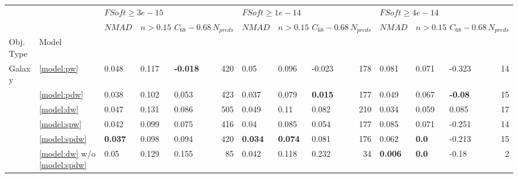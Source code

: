 \documentclass[fleqn,usenatbib]{mnras}
\begin{document}
\begin{table}
	\begin{tabular}{lllllrlllrlllr}
            \hline
                &    & \multicolumn{4}{l}{$FSoft \geq 3e-15$} & \multicolumn{4}{l}{$FSoft \geq 1e-14$} & \multicolumn{4}{l}{$FSoft \geq 4e-14$} \\
                &    &             $NMAD$ &        $n>0.15$ &  $C_{68} - 0.68$ & $N_{preds}$ &             $NMAD$ &        $n>0.15$ &  $C_{68} - 0.68$ & $N_{preds}$ &             $NMAD$ &        $n>0.15$ &  $C_{68} - 0.68$ & $N_{preds}$ \\
            Obj. Type & Model &                    &                 &                  &             &                    &                 &                  &             &                    &                 &                  &             \\
            \hline
            Galaxy & \ref{model:pw} &              0.048 &           0.117 &  \textbf{-0.018} &         420 &               0.05 &           0.096 &           -0.023 &         178 &              0.081 &           0.071 &           -0.323 &          14 \\
                & \ref{model:pdw} &              0.038 &           0.102 &            0.053 &         423 &              0.037 &           0.079 &   \textbf{0.015} &         177 &              0.049 &           0.067 &   \textbf{-0.08} &          15 \\
                & \ref{model:dw} &              0.047 &           0.131 &            0.086 &         505 &              0.049 &            0.11 &            0.082 &         210 &              0.034 &           0.059 &            0.085 &          17 \\
                & \ref{model:spw} &              0.042 &           0.099 &            0.075 &         416 &               0.04 &           0.085 &            0.054 &         177 &              0.085 &           0.071 &           -0.251 &          14 \\
                & \ref{model:spdw} &     \textbf{0.037} &           0.098 &            0.094 &         420 &     \textbf{0.034} &  \textbf{0.074} &            0.081 &         176 &              0.062 &    \textbf{0.0} &           -0.213 &          15 \\
                & \ref{model:dw} w/o \ref{model:spdw} &               0.05 &           0.129 &            0.155 &          85 &              0.042 &           0.118 &            0.232 &          34 &     \textbf{0.006} &    \textbf{0.0} &            -0.18 &           2 \\

\end{tabular}
\end{table}
\end{document}
